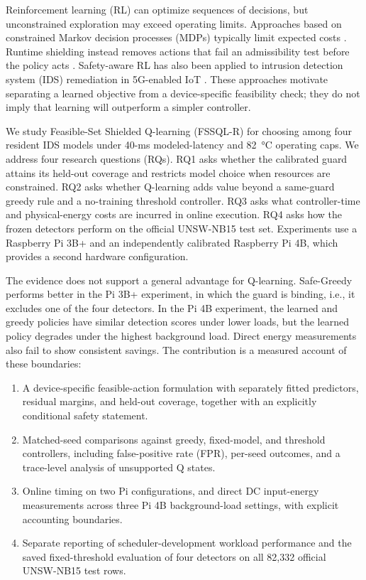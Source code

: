 \documentclass[journal]{IEEEtran}
\begin{document}
Reinforcement learning (RL) can optimize sequences of decisions, but unconstrained exploration may exceed operating limits. Approaches based on constrained Markov decision processes (MDPs) typically limit expected costs \cite{altman1999cmdp,achiam2017cpo,chow2018lyapunov}. Runtime shielding instead removes actions that fail an admissibility test before the policy acts \cite{alshiekh2018shielding,carr2023partialshielding,koenighofer2025shields}. Safety-aware RL has also been applied to intrusion detection system (IDS) remediation in 5G-enabled IoT \cite{malwi2026safetyaware}. These approaches motivate separating a learned objective from a device-specific feasibility check; they do not imply that learning will outperform a simpler controller.

We study Feasible-Set Shielded Q-learning (FSSQL-R) for choosing among four resident IDS models under 40-ms modeled-latency and \SI{82}{\celsius} operating caps. We address four research questions (RQs). RQ1 asks whether the calibrated guard attains its held-out coverage and restricts model choice when resources are constrained. RQ2 asks whether Q-learning adds value beyond a same-guard greedy rule and a no-training threshold controller. RQ3 asks what controller-time and physical-energy costs are incurred in online execution. RQ4 asks how the frozen detectors perform on the official UNSW-NB15 test set. Experiments use a Raspberry Pi 3B+ and an independently calibrated Raspberry Pi 4B, which provides a second hardware configuration.

The evidence does not support a general advantage for Q-learning. Safe-Greedy performs better in the Pi 3B+ experiment, in which the guard is binding, i.e., it excludes one of the four detectors. In the Pi 4B experiment, the learned and greedy policies have similar detection scores under lower loads, but the learned policy degrades under the highest background load. Direct energy measurements also fail to show consistent savings. The contribution is a measured account of these boundaries:
\begin{enumerate}[leftmargin=*,itemsep=1pt]
\item A device-specific feasible-action formulation with separately fitted predictors, residual margins, and held-out coverage, together with an explicitly conditional safety statement.
\item Matched-seed comparisons against greedy, fixed-model, and threshold controllers, including false-positive rate (FPR), per-seed outcomes, and a trace-level analysis of unsupported Q states.
\item Online timing on two Pi configurations, and direct DC input-energy measurements across three Pi 4B background-load settings, with explicit accounting boundaries.
\item Separate reporting of scheduler-development workload performance and the saved fixed-threshold evaluation of four detectors on all 82,332 official UNSW-NB15 test rows.
\end{enumerate}
\end{document}

